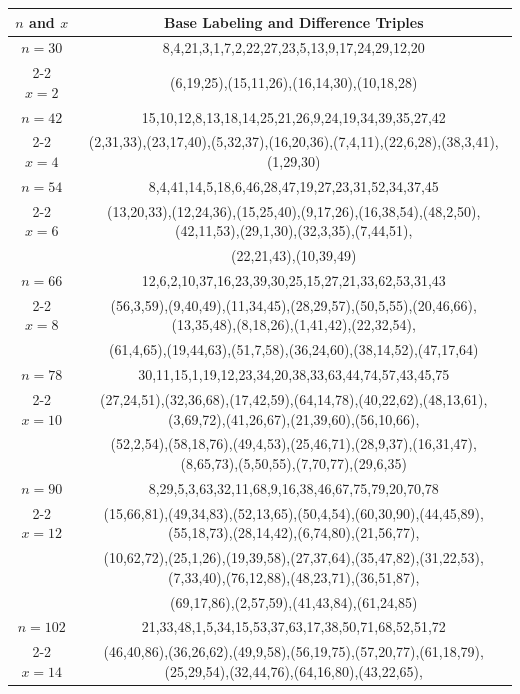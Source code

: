 \begin{tabular}{| c | c |}
\hline
\(n\) and \(x\) & Base Labeling and Difference Triples\\
\hline
\(n=30\) & 
8,4,21,3,1,7,2,22,27,23,5,13,9,17,24,29,12,20\\
\cline{2-2}
\(x=2\)
&(6,19,25),(15,11,26),(16,14,30),(10,18,28)\\
\hline 
\(n=42\) & 
15,10,12,8,13,18,14,25,21,26,9,24,19,34,39,35,27,42\\
\cline{2-2}
\(x=4\)
&(2,31,33),(23,17,40),(5,32,37),(16,20,36),(7,4,11),(22,6,28),(38,3,41),(1,29,30)\\
\hline 
\(n=54\) & 
8,4,41,14,5,18,6,46,28,47,19,27,23,31,52,34,37,45\\
\cline{2-2}
\(x=6\)
&(13,20,33),(12,24,36),(15,25,40),(9,17,26),(16,38,54),(48,2,50),(42,11,53),(29,1,30),(32,3,35),(7,44,51),\\
&(22,21,43),(10,39,49)\\
\hline 
\(n=66\) & 
12,6,2,10,37,16,23,39,30,25,15,27,21,33,62,53,31,43\\
\cline{2-2}
\(x=8\)
&(56,3,59),(9,40,49),(11,34,45),(28,29,57),(50,5,55),(20,46,66),(13,35,48),(8,18,26),(1,41,42),(22,32,54),\\
&(61,4,65),(19,44,63),(51,7,58),(36,24,60),(38,14,52),(47,17,64)\\
\hline 
\(n=78\) & 
30,11,15,1,19,12,23,34,20,38,33,63,44,74,57,43,45,75\\
\cline{2-2}
\(x=10\)
&(27,24,51),(32,36,68),(17,42,59),(64,14,78),(40,22,62),(48,13,61),(3,69,72),(41,26,67),(21,39,60),(56,10,66),\\
&(52,2,54),(58,18,76),(49,4,53),(25,46,71),(28,9,37),(16,31,47),(8,65,73),(5,50,55),(7,70,77),(29,6,35)\\
\hline 
\(n=90\) & 
8,29,5,3,63,32,11,68,9,16,38,46,67,75,79,20,70,78\\
\cline{2-2}
\(x=12\)
&(15,66,81),(49,34,83),(52,13,65),(50,4,54),(60,30,90),(44,45,89),(55,18,73),(28,14,42),(6,74,80),(21,56,77),\\
&(10,62,72),(25,1,26),(19,39,58),(27,37,64),(35,47,82),(31,22,53),(7,33,40),(76,12,88),(48,23,71),(36,51,87),\\
&(69,17,86),(2,57,59),(41,43,84),(61,24,85)\\
\hline 
\(n=102\) & 
21,33,48,1,5,34,15,53,37,63,17,38,50,71,68,52,51,72\\
\cline{2-2}
\(x=14\)
&(46,40,86),(36,26,62),(49,9,58),(56,19,75),(57,20,77),(61,18,79),(25,29,54),(32,44,76),(64,16,80),(43,22,65),\\

\end{tabular}
